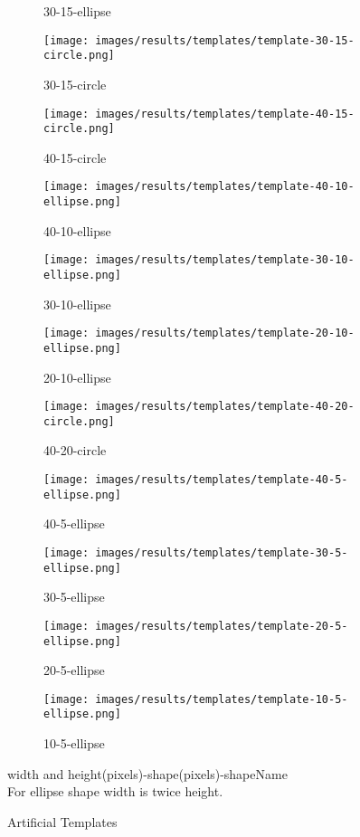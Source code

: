 \begin{figure}[H]
\begin{subfigure}{.25\textwidth}
    \caption{30-15-ellipse}
\end{subfigure}%
\begin{subfigure}{.25\textwidth}
\centering
    \texttt{[image: images/results/templates/template-30-15-circle.png]}
    \caption{30-15-circle}
\end{subfigure}%
\begin{subfigure}{.25\textwidth}
\centering
    \texttt{[image: images/results/templates/template-40-15-circle.png]}
    \caption{40-15-circle}
\end{subfigure}
\begin{subfigure}{.25\textwidth}
\centering
    \texttt{[image: images/results/templates/template-40-10-ellipse.png]}
    \caption{40-10-ellipse}
\end{subfigure}%
\begin{subfigure}{.25\textwidth}
\centering
    \texttt{[image: images/results/templates/template-30-10-ellipse.png]}
    \caption{30-10-ellipse}
\end{subfigure}%
\begin{subfigure}{.25\textwidth}
\centering
    \texttt{[image: images/results/templates/template-20-10-ellipse.png]}
    \caption{20-10-ellipse}
\end{subfigure}%
\begin{subfigure}{.25\textwidth}
\centering
    \texttt{[image: images/results/templates/template-40-20-circle.png]}
    \caption{40-20-circle}
\end{subfigure}
\begin{subfigure}{.25\textwidth}
\centering
    \texttt{[image: images/results/templates/template-40-5-ellipse.png]}
    \caption{40-5-ellipse}
\end{subfigure}%
\begin{subfigure}{.25\textwidth}
\centering
    \texttt{[image: images/results/templates/template-30-5-ellipse.png]}
    \caption{30-5-ellipse}
\end{subfigure}%
\begin{subfigure}{.25\textwidth}
\centering
    \texttt{[image: images/results/templates/template-20-5-ellipse.png]}
    \caption{20-5-ellipse}
\end{subfigure}%
\begin{subfigure}{.25\textwidth}
\centering
    \texttt{[image: images/results/templates/template-10-5-ellipse.png]}
    \caption{10-5-ellipse}
\end{subfigure}

    \caption{Artificial Templates }
    \medskip
    \small
    width and height(pixels)-shape(pixels)-shapeName \\ For ellipse shape width is twice height.
    \label{fig:Artifical-templates}
\end{figure}


